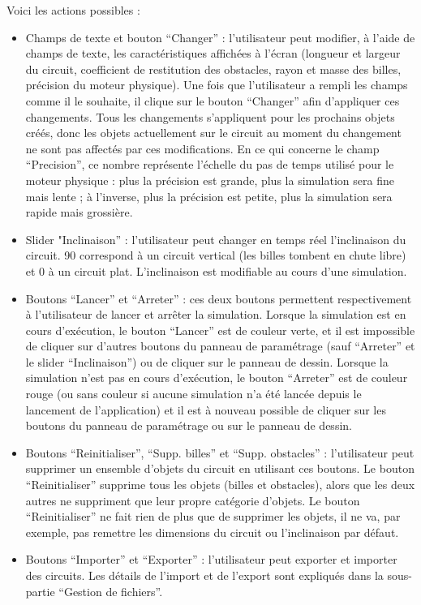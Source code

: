 \documentclass{report}
\begin{document}
Voici les actions possibles :
\begin{itemize}
\item Champs de texte et bouton “Changer” : l’utilisateur peut modifier, à l’aide de champs de texte, les caractéristiques affichées à l’écran (longueur et largeur du circuit, coefficient de restitution des obstacles, rayon et masse des billes, précision du moteur physique). Une fois que l’utilisateur a rempli les champs comme il le souhaite, il clique sur le bouton “Changer” afin d’appliquer ces changements. Tous les changements s’appliquent pour les prochains objets créés, donc les objets actuellement sur le circuit au moment du changement ne sont pas affectés par ces modifications. En ce qui concerne le champ “Precision”, ce nombre représente l’échelle du pas de temps utilisé pour le moteur physique : plus la précision est grande, plus la simulation sera fine mais lente ; à l’inverse, plus la précision est petite, plus la simulation sera rapide mais grossière.
\item Slider "Inclinaison” : l’utilisateur peut changer en temps réel l’inclinaison du circuit. 90 correspond à un circuit vertical (les billes tombent en chute libre) et 0 à un circuit plat. L’inclinaison est modifiable au cours d’une simulation.
\item Boutons “Lancer” et “Arreter” : ces deux boutons permettent respectivement à l’utilisateur de lancer et arrêter la simulation. Lorsque la simulation est en cours d’exécution, le bouton “Lancer” est de couleur verte, et il est impossible de cliquer sur d’autres boutons du panneau de paramétrage (sauf “Arreter” et le slider “Inclinaison”) ou de cliquer sur le panneau de dessin. Lorsque la simulation n’est pas en cours d’exécution, le bouton “Arreter” est de couleur rouge (ou sans couleur si aucune simulation n’a été lancée depuis le lancement de l’application) et il est à nouveau possible de cliquer sur les boutons du panneau de paramétrage ou sur le panneau de dessin.
\item Boutons “Reinitialiser”, “Supp. billes” et “Supp. obstacles” : l’utilisateur peut supprimer un ensemble d’objets du circuit en utilisant ces boutons. Le bouton “Reinitialiser” supprime tous les objets (billes et obstacles), alors que les deux autres ne suppriment que leur propre catégorie d’objets. Le bouton “Reinitialiser” ne fait rien de plus que de supprimer les objets, il ne va, par exemple, pas remettre les dimensions du circuit ou l’inclinaison par défaut.
\item Boutons “Importer” et “Exporter” : l’utilisateur peut exporter et importer des circuits. Les détails de l’import et de l’export sont expliqués dans la sous-partie “Gestion de fichiers”.
\end{itemize}
\end{document}
